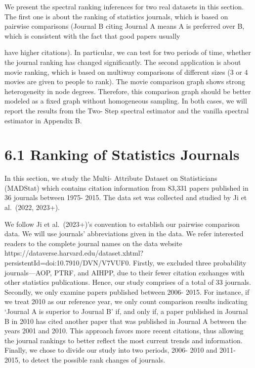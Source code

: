 We present the spectral ranking inferences for two real datasets in this
section. The first one is about the ranking of statistics journals,
which is based on pairwise comparisons (Journal B citing Journal A means
A is preferred over B, which is consistent with the fact that good
papers usually

have higher citations). In particular, we can test for two periods of
time, whether the journal ranking has changed significantly. The second
application is about movie ranking, which is based on multiway
comparisons of different sizes (3 or 4 movies are given to people to
rank). The movie comparison graph shows strong heterogeneity in node
degrees. Therefore, this comparison graph should be better modeled as a
fixed graph without homogeneous sampling. In both cases, we will report
the results from the Two- Step spectral estimator and the vanilla
spectral estimator in Appendix B.

\section{6.1 Ranking of Statistics
Journals}\label{ranking-of-statistics-journals}

In this section, we study the Multi- Attribute Dataset on Statisticians
(MADStat) which contains citation information from 83,331 papers
published in 36 journals between 1975- 2015. The data set was collected
and studied by Ji et al.~(2022, 2023+).

We follow Ji et al.~(2023+)'s convention to establish our pairwise
comparison data. We will use journals' abbreviations given in the data.
We refer interested readers to the complete journal names on the data
website
https://dataverse.harvard.edu/dataset.xhtml?persistentId=doi:10.7910/DVN/V7VUF0.
Firstly, we excluded three probability journals---AOP, PTRF, and AIHPP,
due to their fewer citation exchanges with other statistics
publications. Hence, our study comprises of a total of 33 journals.
Secondly, we only examine papers published between 2006- 2015. For
instance, if we treat 2010 as our reference year, we only count
comparison results indicating `Journal A is superior to Journal B' if,
and only if, a paper published in Journal B in 2010 has cited another
paper that was published in Journal A between the years 2001 and 2010.
This approach favors more recent citations, thus allowing the journal
rankings to better reflect the most current trends and information.
Finally, we chose to divide our study into two periods, 2006- 2010 and
2011- 2015, to detect the possible rank changes of journals.

